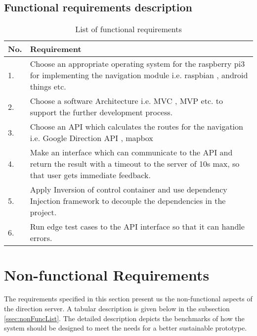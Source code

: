        \subsection{Functional requirements description}
            \label{ssec:FuncList}
            \begin{table}[h!]
                \centering
                    \begin{tabular}{|p{1cm}||p{15cm}|}
                        \hline
                            \textbf{No.} & \textbf{Requirement} \\
                        \hline
                            1. & Choose an appropriate operating system for the raspberry pi3 for implementing 
                            the navigation module i.e. raspbian \cite{raspbien}, 
                            android things \cite{androidThings} etc.\\
                        \hline
                            2. & Choose a software Architecture i.e. MVC \cite{mvc}, MVP \cite{mvp}
                            etc. to support the further development process.\\ 
                        \hline
                            3. & Choose an API which calculates the routes for the navigation i.e. Google Direction API \cite{googleDirecAPI}, mapbox \cite{mapbox} \\     
                        \hline
                            4. & Make an interface which can communicate to the API and return the result with a 
                            timeout to the server of 10s max, so that user gets immediate feedback. \\    
                        \hline  
                            5. & Apply Inversion of control container and use dependency Injection 
                            \cite{Martinfowler2014} framework to decouple the  dependencies 
                            in the project.\\
                        \hline   
                            6. & Run edge test cases to the API interface so that it can handle
                            errors.\\    
                        \hline    
                    \end{tabular}
                    \caption{List of functional requirements}
                    \label{table:functionalRequirements}
            \end{table}  

    \section{Non-functional Requirements}
        The requirements specified in this section present us the non-functional aspects of the 
        direction server. A tabular description is given below in the subsection 
        \ref{ssec:nonFuncList}. The detailed description depicts the benchmarks of how the system
        should be designed to meet the needs for a better sustainable prototype.


